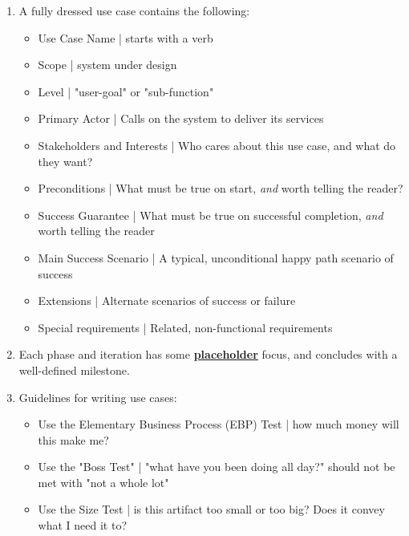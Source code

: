 \documentclass{article}
\begin{document}
\begin{enumerate}

\item A fully dressed use case contains the following:
\begin{itemize}
\item Use Case Name | starts with a verb
\item Scope | system under design
\item Level | "user-goal" or "sub-function"
\item Primary Actor | Calls on the system to deliver its services
\item Stakeholders and Interests | Who cares about this use case, and what do they want?
\item Preconditions | What must be true on start, \emph{and} worth telling the reader?
\item Success Guarantee | What must be true on successful completion, \emph{and} worth telling the reader
\item Main Success Scenario | A typical, unconditional happy path scenario of success
\item Extensions | Alternate scenarios of success or failure
\item Special requirements | Related, non-functional requirements
\end{itemize}

\item Each phase and iteration has some \underline{\textbf{placeholder}} focus, and concludes with a well-defined milestone.

\item Guidelines for writing use cases:
\begin{itemize}
\item Use the Elementary Business Process (EBP) Test | how much money will this make me?
\item Use the "Boss Test" | "what have you been doing all day?" should not be met with "not a whole lot"
\item Use the Size Test | is this artifact too small or too big? Does it convey what I need it to?
\end{itemize}


\end{enumerate}
\end{document}
